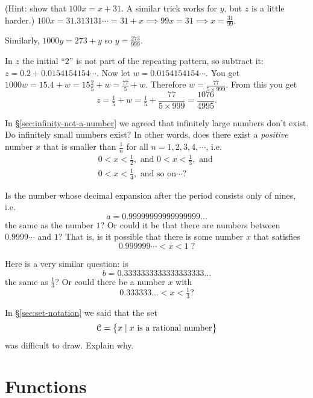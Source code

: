 \begin{multicols}{2}

(Hint: show that $100x=x+31$. A similar trick works for $y$, but $z$
is a little harder.)
\answer 
$100x = 31.313131\cdots = 31+x \implies 99x = 31 \implies x =
\frac{31}{99}$.

Similarly, $1000y = 273 + y$ so $y= \frac{273}{999}$.

In $z$ the initial ``$2$'' is not part of the repeating pattern, so
subtract it:  $z = 0.2 + 0.0154154154\cdots$.  Now let
$w=0.0154154154\cdots$.  You get $1000w = 15.4+w = 15\frac25 + w =
\frac{77}{5}+w$. Therefore $w= \frac{77}{5\times 999}$.
From this you get
\[
z = \tfrac15+w = \tfrac15 +  \frac{77}{5\times999} = \frac{1076}{4995}.
\]
\endanswer

\problem \groupproblem\label{ex:no-infinitely-small-numbers} 
\subprob In \S\ref{sec:infinity-not-a-number} we agreed that
infinitely large numbers don't exist. Do infinitely small numbers
exist?   In other words, does there exist a \emph{positive} number $x$
that is smaller than $\frac1n$ for all $n=1, 2, 3, 4, \cdots$, i.e.
\begin{gather*}
  0<x<\tfrac{1}{2}, \text{ and }
  0<x<\tfrac{1}{3}, \text{ and } \\
  0<x<\tfrac{1}{4}, \text{ and so on} \cdots?
\end{gather*}

\subprob
Is the number whose decimal expansion after the period consists only
of nines, i.e.
\[
a=0.99999999999999999\dots
\]
the same as the number $1$?  Or could it be that there are numbers
between $0.9999\cdots$ and $1$?  That is, is it possible that there is
some number $x$ that satisfies
\[
0.999999\cdots < x < 1 \; ?
\]

\subprob  Here is a very similar question:  is
\[
b=0.3333333333333333333\dots
\]
the same as $\frac13$?  Or could there be a number $x$ with
\[
0.333333\dots <x<\tfrac13 ?
\]

\problem In \S\ref{sec:set-notation} we said that the set 
\[
\mathcal{C} = \bigl\{x \mid \text{$x$ is a rational number}\bigr\}
\]
was difficult to draw.  Explain why.

\end{multicols}

\noproblemfont%

\section{Functions} 

